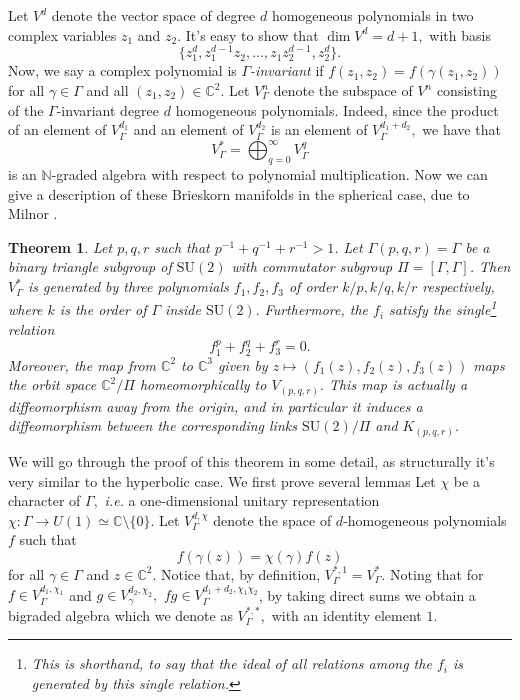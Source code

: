 \documentclass{article}
\newtheorem{theorem}{Theorem}[section]
\begin{document}
 Let $V^d$ denote the vector space of degree $d$ homogeneous polynomials in two complex variables $z_1$ and $z_2$. It's easy to show that $\dim V^d = d+1,$ with basis $$\{z_1^d, z_1^{d-1}z_2, \dots, z_1z_2^{d-1}, z_2^d\}.$$
 Now, we say a complex polynomial is \textit{$\Gamma$-invariant} if $f(z_1, z_2) = f(\gamma(z_1, z_2))$ for all $\gamma \in \Gamma$ and all $(z_1, z_2) \in \mathbb{C}^2$. Let $V^n_\Gamma$ denote the subspace of $V^n$ consisting of the $\Gamma$-invariant degree $d$ homogeneous polynomials. Indeed, since the product of an element of $V_\Gamma^{d_1}$ and an element of $V_\Gamma^{d_2}$ is an element of $V_\Gamma^{d_1 + d_2},$ we have that
 \[V^*_\Gamma = \bigoplus_{q = 0}^\infty V^q_\Gamma\]
 is an $\mathbb{N}$-graded algebra with respect to polynomial multiplication. Now we can give a description of these Brieskorn manifolds in the spherical case, due to Milnor \cite{milnor_1975}.
 \begin{theorem}
 \label{Theorem 4.2}
 Let $p,q,r$ such that $p^{-1} + q^{-1} + r^{-1} > 1$. Let $\Gamma(p,q,r) = \Gamma$ be a binary triangle subgroup of $\mathrm{SU}(2)$ with commutator subgroup $\Pi = [\Gamma, \Gamma]$. Then $V^*_\Gamma$ is generated by three polynomials $f_1, f_2, f_3$ of order $k/p, k/q, k/r$ respectively, where $k$ is the order of $\Gamma$ inside $\mathrm{SU}(2).$ Furthermore, the $f_i$ satisfy the single\footnote{This is shorthand, to say that the ideal of all relations among the $f_i$ is generated by this single relation.} relation
 \[f_1^p + f_2^q + f_3^r = 0.\]
Moreover, the map from $\mathbb{C}^2$ to $\mathbb{C}^3$ given by $z \mapsto (f_1(z), f_2(z), f_3(z))$ maps the orbit space $\mathbb{C}^2/\Pi$ homeomorphically to $V_{(p,q,r)}.$ This map is actually a diffeomorphism away from the origin, and in particular it induces a diffeomorphism between the corresponding links $\mathrm{SU(2)}/\Pi$ and $K_{(p,q,r)}.$
 \end{theorem}
 We will go through the proof of this theorem in some detail, as structurally it's very similar to the hyperbolic case. We first prove several lemmas Let $\chi$ be a character of $\Gamma,$ \textit{i.e.} a one-dimensional unitary representation $\chi: \Gamma \to U(1) \simeq \mathbb{C}\setminus \{0\}.$ Let $V^{d, \chi}_\Gamma$ denote the space of $d$-homogeneous polynomials $f$ such that
 \[f(\gamma(z)) = \chi(\gamma)f(z)\]
 for all $\gamma \in \Gamma$ and $z \in \mathbb{C}^2$.  Notice that, by definition, $V^{\ast,1}_\Gamma = V_\Gamma^\ast.$ Noting that for $f \in V_\Gamma^{d_1, \chi_1}$ and $g \in V_\gamma^{d_2, \chi_2},$ $fg \in V_\Gamma^{d_1+d_2, \chi_1\chi_2}$, by taking direct sums we obtain a bigraded algebra which we denote as $V^{\ast, \ast}_\Gamma,$ with an identity element $1$.
\end{document}
